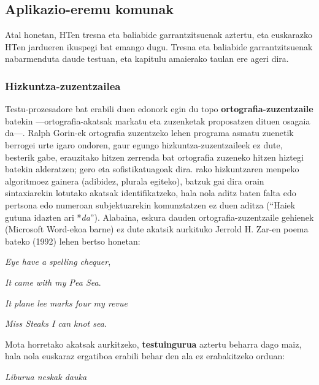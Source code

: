 \begin{multicols}{2}
\subsection{Aplikazio-eremu komunak} 
Atal honetan, HTen tresna eta baliabide garrantzitsuenak aztertu, eta euskarazko HTen jardueren ikuspegi bat emango dugu. Tresna eta baliabide garrantzitsuenak nabarmenduta daude testuan, eta kapitulu amaierako taulan ere ageri dira.

\subsubsection{Hizkuntza-zuzentzailea}
   Testu-prozesadore bat erabili duen edonork egin du topo \textbf{ortografia-zuzentzaile} batekin —ortografia-akatsak markatu eta zuzenketak proposatzen dituen osagaia da—. Ralph Gorin-ek ortografia zuzentzeko lehen programa asmatu zuenetik berrogei urte igaro ondoren, gaur egungo hizkuntza-zuzentzaileek ez dute, besterik gabe, erauzitako hitzen zerrenda bat ortografia zuzeneko hitzen hiztegi batekin alderatzen; gero eta sofistikatuagoak dira. rako hizkuntzaren menpeko algoritmoez gainera (adibidez, plurala egiteko), batzuk gai dira orain sintaxiarekin lotutako akatsak identifikatzeko, hala nola aditz baten falta edo pertsona edo numeroan subjektuarekin komunztatzen ez duen aditza (“Haiek gutuna idazten ari *\textit{da}”). Alabaina, eskura dauden ortografia-zuzentzaile gehienek (Microsoft Word-ekoa barne) ez dute akatsik aurkituko Jerrold H. Zar-en poema bateko (1992) lehen bertso honetan: 

\hspace{10pt}\textit{Eye have a spelling chequer},

\hspace{10pt}\textit{It came with my Pea Sea}.

\hspace{10pt}\textit{It plane lee marks four my revue}

\hspace{10pt}\textit{Miss Steaks I can knot sea.}

Mota horretako akatsak aurkitzeko, \textbf{testuin\-gurua} aztertu beharra dago maiz, hala nola euskaraz ergatiboa erabili behar den ala ez erabakitzeko orduan:

\hspace{10pt}\textit{Liburua neskak dauka }
 

\end{multicols}
